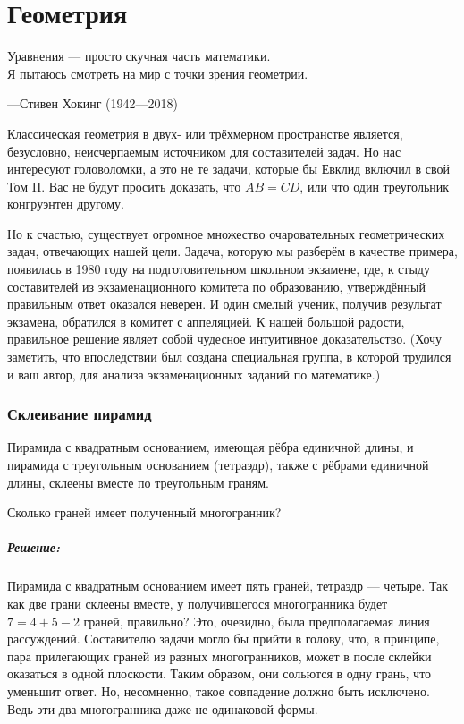 \chapter*{Геометрия}

\setlength{\epigraphwidth}{.72\textwidth}
\epigraph{Уравнения --- просто скучная часть математики.\\
Я пытаюсь смотреть на мир с точки зрения геометрии.}{---Стивен Хокинг (1942---2018)}

Классическая геометрия в двух- или трёхмерном пространстве является, безусловно, неисчерпаемым источником для составителей задач. 
Но нас интересуют головоломки, а это не те задачи, которые бы Евклид включил в свой Том II.
Вас не будут просить доказать, что $AB=CD$, или что один треугольник конгруэнтен другому.

Но к счастью, существует огромное множество очаровательных геометрических задач, отвечающих нашей цели. 
Задача, которую мы разберём в качестве примера, появилась в 1980 году на подготовительном  школьном экзамене, %
где, к стыду составителей из экзаменационного комитета по образованию, %
утверждённый правильным ответ оказался неверен.
И один смелый ученик, получив результат экзамена, обратился в комитет с аппеляцией.
К нашей большой радости, правильное решение являет собой  чудесное интуитивное доказательство.
(Хочу заметить, что впоследствии был создана специальная группа, в которой  трудился и ваш автор, для анализа экзаменационных заданий по математике.)

\subsection*{Склеивание пирамид}%

Пирамида с квадратным основанием, имеющая рёбра единичной длины, и пирамида с треугольным основанием (тетраэдр), также с рёбрами единичной длины, склеены вместе по треугольным граням.

Сколько граней имеет полученный многогранник?

\paragraph{Решение:}

Пирамида с квадратным основанием имеет пять граней, тетраэдр --- четыре.
Так как две грани склеены вместе, у получившегося многогранника будет $7=4+5-2$ граней, правильно?
Это, очевидно, была предполагаемая линия рассуждений.
Составителю задачи могло бы прийти в голову, что, в принципе, пара прилегающих граней из разных многогранников, может в после склейки оказаться в одной плоскости.
Таким образом, они сольются в одну грань, что уменьшит ответ.
Но, несомненно, такое совпадение должно быть исключено.
Ведь эти два многогранника даже не одинаковой формы.

